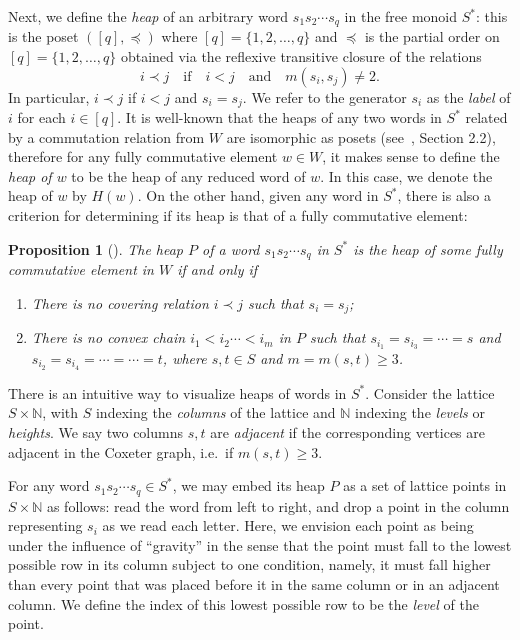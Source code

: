 \documentclass[10pt]{article}
\newtheorem{prop}[theorem]{Proposition}
\theoremstyle{definition}
\providecommand{\ie}{i.e.\ }
\newcommand{\N}{\mathbb{N}}
\begin{document}
 Next, we define the \emph{heap} of an arbitrary word $s_1s_2\cdots s_q$ in the free
 monoid $S^*$: this is the poset $([q],\preccurlyeq)$ where
 $[q]=\{1,2,\ldots,q\}$ and $\preccurlyeq$ is the partial order on
 $[q]=\{1,2,\ldots,q\}$ obtained via the reflexive transitive closure of the relations
 \[
 i\prec j \quad\text{if}\quad i<j\quad\text{and}\quad m(s_i,s_j)\neq 2.
 \]
 In particular, $i\prec j$ if $i<j$ and $s_i=s_j$. We refer to the
 generator $s_i$ as the \emph{label} of $i$ for each $i\in [q]$. It is well-known that the heaps of
 any two words in $S^*$ related by a commutation relation from $W$ are
 isomorphic as posets (see~\cite{FC}, Section 2.2), therefore for any fully commutative element $w\in W$,
 it makes sense to define the \emph{heap of $w$} to be the heap of any reduced
 word of $w$. In this case, we denote the heap of $w$ by $H(w)$. On the other
 hand, given any word in $S^*$, there is also a criterion for
 determining if its heap is that of a fully commutative element:

 \begin{prop}[{\cite[Proposition~3.3]{FC}}]
 \label{fc criterion}
 The heap $P$ of a word $s_1s_2\cdots s_q$ in $S^*$ is the heap of some fully commutative
 element in $W$ if and only if 
 \begin{enumerate}
 \item There is no covering relation $i\prec j$ such that $s_i=s_j$;
 \item There is no convex chain $i_1<i_2\cdots <i_m$ in $P$ such that
 $s_{i_1}=s_{i_3}=\cdots = s$ and $s_{i_2}=s_{i_4}=\cdots=\cdots=t$,
 where $s,t\in S$ and $m = m(s,t)\ge 3$.
 \end{enumerate}
 \end{prop}

 There is an intuitive way to visualize heaps of words in $S^*$. Consider the lattice $S\times \N$, with $S$
 indexing the \emph{columns} of the lattice and $\N$ indexing the \emph{levels}
 or
 \emph{heights}. We say two
 columns $s,t$ are \emph{adjacent} if the corresponding vertices are adjacent in the
 Coxeter graph, \ie if $m(s,t)\ge 3$.

 For any word $s_1s_2\cdots s_q\in S^*$, we may
 embed its heap $P$ as a set of lattice points in $S\times \N$ as follows:
 read the word from left to right, and drop a point in the column representing
 $s_i$ as we read each letter. Here, we envision each point as being under the
 influence of ``gravity'' in the sense that the point must fall to the lowest
 possible row in its column subject to one condition, namely, it must fall
 higher than every point that was placed before it in the same column
 or in an adjacent column. We define the index of this lowest possible row
 to be the \emph{level} of the point. 
 
\end{document}
